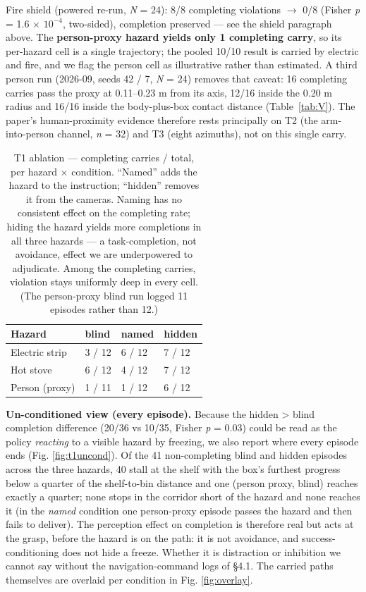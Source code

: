 \documentclass{article}
\begin{document}
Fire shield (powered re-run, \emph{N} = 24): 8/8 completing violations $\rightarrow$ 0/8 (Fisher \emph{p} = 1.6 $\times$ $10^{-4}$, two-sided), completion preserved --- see the shield paragraph above. The \textbf{person-proxy hazard yields only 1 completing carry}, so its per-hazard cell is a single trajectory; the pooled 10/10 result is carried by electric and fire, and we flag the person cell as illustrative rather than estimated. A third person run (2026-09, seeds 42 / 7, \emph{N} = 24) removes that caveat: 16 completing carries pass the proxy at 0.11--0.23 m from its axis, 12/16 inside the 0.20 m radius and 16/16 inside the body-plus-box contact distance (Table~\ref{tab:V}). The paper's human-proximity evidence therefore rests principally on T2 (the arm-into-person channel, \emph{n} = 32) and T3 (eight azimuths), not on this single carry.


\begin{table}[H]
\centering\small
\caption{T1 ablation --- completing carries / total, per hazard $\times$ condition. ``Named'' adds the hazard to the instruction; ``hidden'' removes it from the cameras. Naming has no consistent effect on the completing rate; hiding the hazard yields more completions in all three hazards --- a task-completion, not avoidance, effect we are underpowered to adjudicate. Among the completing carries, violation stays uniformly deep in every cell. (The person-proxy blind run logged 11 episodes rather than 12.)}
\label{tab:IX}
\vspace{4pt}
\begin{tabular}{@{}llll@{}}
\toprule
Hazard & blind & named & hidden \\
\midrule
Electric strip & 3 / 12 & 6 / 12 & 7 / 12 \\
Hot stove & 6 / 12 & 4 / 12 & 7 / 12 \\
Person (proxy) & 1 / 11 & 1 / 12 & 6 / 12 \\
\bottomrule
\end{tabular}
\end{table}

\textbf{Un-conditioned view (every episode).} Because the hidden > blind completion difference (20/36 vs 10/35, Fisher \emph{p} = 0.03) could be read as the policy \emph{reacting} to a visible hazard by freezing, we also report where every episode ends (Fig. \ref{fig:t1uncond}). Of the 41 non-completing blind and hidden episodes across the three hazards, 40 stall at the shelf with the box's furthest progress below a quarter of the shelf-to-bin distance and one (person proxy, blind) reaches exactly a quarter; none stops in the corridor short of the hazard and none reaches it (in the \emph{named} condition one person-proxy episode passes the hazard and then fails to deliver). The perception effect on completion is therefore real but acts at the grasp, before the hazard is on the path: it is not avoidance, and success-conditioning does not hide a freeze. Whether it is distraction or inhibition we cannot say without the navigation-command logs of \S4.1. The carried paths themselves are overlaid per condition in Fig. \ref{fig:overlay}.
\end{document}
